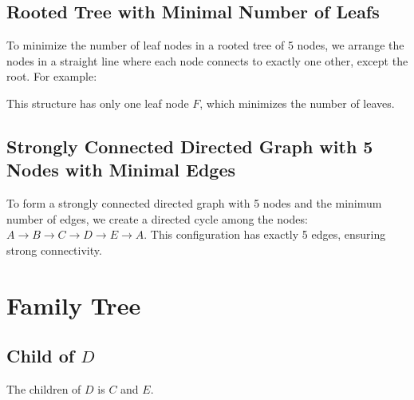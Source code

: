 \documentclass[10pt]{article}
\begin{document}
\subsection{Rooted Tree with Minimal Number of Leafs}
To minimize the number of leaf nodes in a rooted tree of 5 nodes, we arrange the nodes in a straight line where each node connects to exactly one other, except the root. For example:
\begin{center}
\end{center}
This structure has only one leaf node \( F \), which minimizes the number of leaves.

\subsection{Strongly Connected Directed Graph with 5 Nodes with Minimal Edges}
To form a strongly connected directed graph with 5 nodes and the minimum number of edges, we create a directed cycle among the nodes: \( A \rightarrow B \rightarrow C \rightarrow D \rightarrow E \rightarrow A \). This configuration has exactly 5 edges, ensuring strong connectivity.

\begin{center}
\end{center}

\newpage

\section{Family Tree}

\subsection{Child of \( D \)}
The children of \( D \) is \( C \) and $E$.
\end{document}
